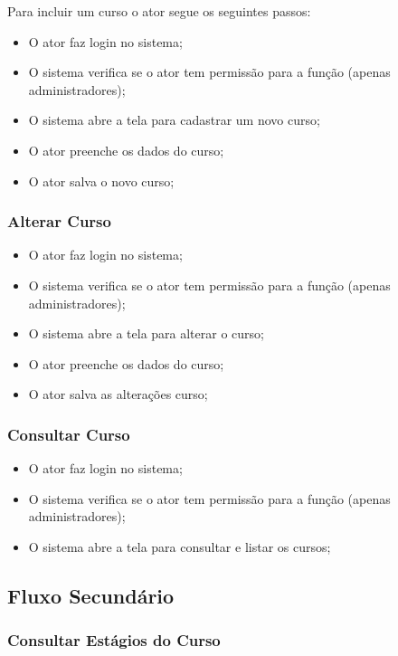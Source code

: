 Para incluir um curso o ator segue os seguintes passos:

\begin{itemize}
  \item O ator faz login no sistema;
  \item O sistema verifica se o ator tem permissão para a função (apenas
  administradores);
  \item O sistema abre a tela para cadastrar um novo curso;
  \item O ator preenche os dados do curso;
  \item O ator salva o novo curso;
\end{itemize}


\subsubsection{Alterar Curso}

\begin{itemize}
  \item O ator faz login no sistema;
  \item O sistema verifica se o ator tem permissão para a função (apenas
  administradores);
  \item O sistema abre a tela para alterar o curso;
  \item O ator preenche os dados do curso;
  \item O ator salva as alterações curso;
\end{itemize}

\subsubsection{Consultar Curso}

\begin{itemize}
  \item O ator faz login no sistema;
  \item O sistema verifica se o ator tem permissão para a função (apenas
  administradores);
  \item O sistema abre a tela para consultar e listar os cursos;
\end{itemize}

\subsection{Fluxo Secundário}

\subsubsection{Consultar Estágios do Curso}

